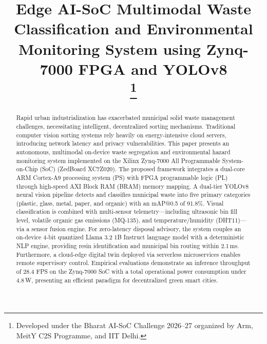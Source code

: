 \documentclass[conference]{IEEEtran}
\begin{document}
\title{Edge AI-SoC Multimodal Waste Classification and Environmental Monitoring System using Zynq-7000 FPGA and YOLOv8\\
\thanks{Developed under the Bharat AI-SoC Challenge 2026--27 organized by Arm, MeitY C2S Programme, and IIT Delhi.}
}

\author{
}

\maketitle

\begin{abstract}
Rapid urban industrialization has exacerbated municipal solid waste management challenges, necessitating intelligent, decentralized sorting mechanisms. Traditional computer vision sorting systems rely heavily on energy-intensive cloud servers, introducing network latency and privacy vulnerabilities. This paper presents an autonomous, multimodal on-device waste segregation and environmental hazard monitoring system implemented on the Xilinx Zynq-7000 All Programmable System-on-Chip (SoC) (ZedBoard XC7Z020). The proposed framework integrates a dual-core ARM Cortex-A9 processing system (PS) with FPGA programmable logic (PL) through high-speed AXI Block RAM (BRAM) memory mapping. A dual-tier YOLOv8 neural vision pipeline detects and classifies municipal waste into five primary categories (plastic, glass, metal, paper, and organic) with an mAP@0.5 of 91.8\%. Visual classification is combined with multi-sensor telemetry—including ultrasonic bin fill level, volatile organic gas emissions (MQ-135), and temperature/humidity (DHT11)—via a sensor fusion engine. For zero-latency disposal advisory, the system couples an on-device 4-bit quantized Llama 3.2 1B Instruct language model with a deterministic NLP engine, providing resin identification and municipal bin routing within 2.1\,ms. Furthermore, a cloud-edge digital twin deployed via serverless microservices enables remote supervisory control. Empirical evaluations demonstrate an inference throughput of 28.4 FPS on the Zynq-7000 SoC with a total operational power consumption under 4.8\,W, presenting an efficient paradigm for decentralized green smart cities.
\end{abstract}
\end{document}
